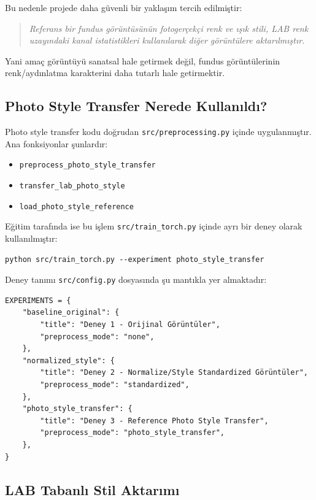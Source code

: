 \documentclass[12pt,a4paper]{article}
\begin{document}
Bu nedenle projede daha güvenli bir yaklaşım tercih edilmiştir:

\begin{quote}
    \textit{Referans bir fundus görüntüsünün fotogerçekçi renk ve ışık stili, LAB renk uzayındaki kanal istatistikleri kullanılarak diğer görüntülere aktarılmıştır.}
\end{quote}

Yani amaç görüntüyü sanatsal hale getirmek değil, fundus görüntülerinin renk/aydınlatma karakterini daha tutarlı hale getirmektir.

\subsection{Photo Style Transfer Nerede Kullanıldı?}

Photo style transfer kodu doğrudan \texttt{src/preprocessing.py} içinde uygulanmıştır. Ana fonksiyonlar şunlardır:

\begin{itemize}
    \item \texttt{preprocess\_photo\_style\_transfer}
    \item \texttt{transfer\_lab\_photo\_style}
    \item \texttt{load\_photo\_style\_reference}
\end{itemize}

Eğitim tarafında ise bu işlem \texttt{src/train\_torch.py} içinde ayrı bir deney olarak kullanılmıştır:

\begin{verbatim}
python src/train_torch.py --experiment photo_style_transfer
\end{verbatim}

Deney tanımı \texttt{src/config.py} dosyasında şu mantıkla yer almaktadır:

\begin{lstlisting}[style=pythonstyle, caption={Deney tanımları: baseline, normalized ve photo style transfer}]
EXPERIMENTS = {
    "baseline_original": {
        "title": "Deney 1 - Orijinal Görüntüler",
        "preprocess_mode": "none",
    },
    "normalized_style": {
        "title": "Deney 2 - Normalize/Style Standardized Görüntüler",
        "preprocess_mode": "standardized",
    },
    "photo_style_transfer": {
        "title": "Deney 3 - Reference Photo Style Transfer",
        "preprocess_mode": "photo_style_transfer",
    },
}
\end{lstlisting}

\subsection{LAB Tabanlı Stil Aktarımı}
\end{document}

